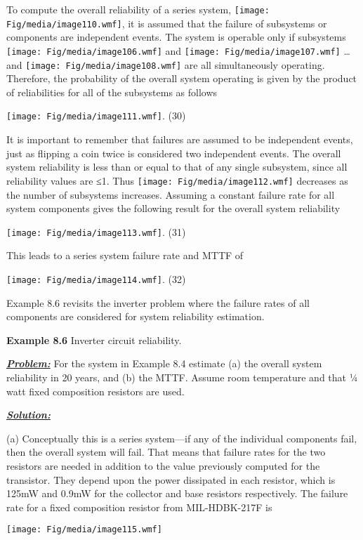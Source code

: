 To compute the overall reliability of a series system,
\texttt{[image: Fig/media/image110.wmf]}, it is assumed that the failure
of subsystems or components are independent events. The system is
operable only if subsystems \texttt{[image: Fig/media/image106.wmf]} and
\texttt{[image: Fig/media/image107.wmf]} \ldots{} and
\texttt{[image: Fig/media/image108.wmf]} are all simultaneously
operating. Therefore, the probability of the overall system operating is
given by the product of reliabilities for all of the subsystems as
follows

\texttt{[image: Fig/media/image111.wmf]}. (30)

It is important to remember that failures are assumed to be independent
events, just as flipping a coin twice is considered two independent
events. The overall system reliability is less than or equal to that of
any single subsystem, since all reliability values are ≤1. Thus
\texttt{[image: Fig/media/image112.wmf]} decreases as the number of
subsystems increases. Assuming a constant failure rate for all system
components gives the following result for the overall system reliability

\texttt{[image: Fig/media/image113.wmf]}. (31)

This leads to a series system failure rate and MTTF of

\texttt{[image: Fig/media/image114.wmf]}. (32)

Example 8.6 revisits the inverter problem where the failure rates of all
components are considered for system reliability estimation.

\textbf{\hfill\break
Example 8.6} Inverter circuit reliability.

\emph{\textbf{\ul{Problem:}}} For the system in Example 8.4 estimate (a)
the overall system reliability in 20 years, and (b) the MTTF. Assume
room temperature and that ¼ watt fixed composition resistors are used.

\emph{\textbf{\ul{Solution:}}}

(a) Conceptually this is a series system---if any of the individual
components fail, then the overall system will fail. That means that
failure rates for the two resistors are needed in addition to the value
previously computed for the transistor. They depend upon the power
dissipated in each resistor, which is 125mW and 0.9mW for the collector
and base resistors respectively. The failure rate for a fixed
composition resistor from MIL-HDBK-217F is

\texttt{[image: Fig/media/image115.wmf]}

